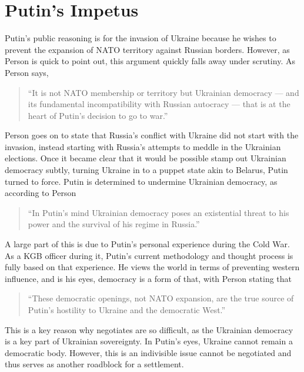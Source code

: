 \documentclass{article}
\begin{document}
\section{Putin's Impetus}

    Putin's public reasoning is for the invasion of Ukraine because he wishes to prevent the expansion of NATO territory against Russian borders. However, as Person is quick to point out, this argument quickly falls away under scrutiny. As Person says,

    \begin{quote}
        ``It is not NATO membership or territory but Ukrainian democracy — and its fundamental incompatibility with Russian autocracy — that is at the heart of Putin's decision to go to war.'' \parencite{person_2025}
    \end{quote}

    Person goes on to state that Russia's conflict with Ukraine did not start with the invasion, instead starting with Russia's attempts to meddle in the Ukrainian elections. Once it became clear that it would be possible stamp out Ukrainian democracy subtly, turning Ukraine in to a puppet state akin to Belarus, Putin turned to force. Putin is determined to undermine Ukrainian democracy, as according to Person

    \begin{quote}
        ``In Putin's mind Ukrainian democracy poses an existential threat to his power and the survival of his regime in Russia.'' \parencite{person_2025}
    \end{quote}

    A large part of this is due to Putin's personal experience during the Cold War. As a KGB officer during it, Putin's current methodology and thought process is fully based on that experience. He views the world in terms of preventing western influence, and is his eyes, democracy is a form of that, with Person stating that

    \begin{quote}
        ``These democratic openings, not NATO expansion, are the true source of Putin's hostility to Ukraine and the democratic West.'' \parencite{person_2025}
    \end{quote}

   This is a key reason why negotiates are so difficult, as the Ukrainian democracy is a key part of Ukrainian sovereignty. In Putin's eyes, Ukraine cannot remain a democratic body. However, this is an indivisible issue cannot be negotiated and thus serves as another roadblock for a settlement. 
\end{document}

